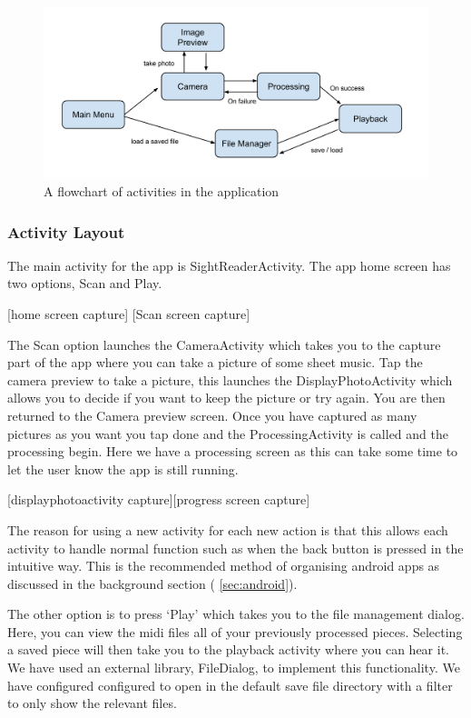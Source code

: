             \begin{figure}[ht!]
                \centering
                \includegraphics[width=150mm]{./assets/activitiesdiag.png}
                \caption{A flowchart of activities in the application}
                \label{image:activitydiag}
            \end{figure}

\subsubsection{Activity Layout}

The main activity for the app is SightReaderActivity. The app home screen has two options, Scan and Play.

[home screen capture] [Scan screen capture]

The Scan option launches the CameraActivity which takes you to the capture part of the app where you can take a picture of some sheet music. Tap the camera preview to take a picture, this launches the DisplayPhotoActivity which allows you to decide if you want to keep the picture or try again. You are then returned to the Camera preview screen. Once you have captured as many pictures as you want you tap done and the ProcessingActivity is called and the processing begin. Here we have a processing screen as this can take some time to let the user know the app is still running.

[displayphotoactivity capture][progress screen capture]

The reason for using a new activity for each new action is that this allows each activity to handle normal function such as when the back button is pressed in the intuitive way. This is the recommended method of organising android apps as discussed in the background section ( \autoref{sec:android}).

The other option is to press ‘Play’ which takes you to the file management dialog. Here, you can view the midi files all of your previously processed pieces. Selecting a saved piece will then take you to the playback activity where you can hear it. We have used an external library, FileDialog\cite{FileDialog}, to implement this functionality. We have configured configured to open in the default save file directory with a filter to only show the relevant files.



